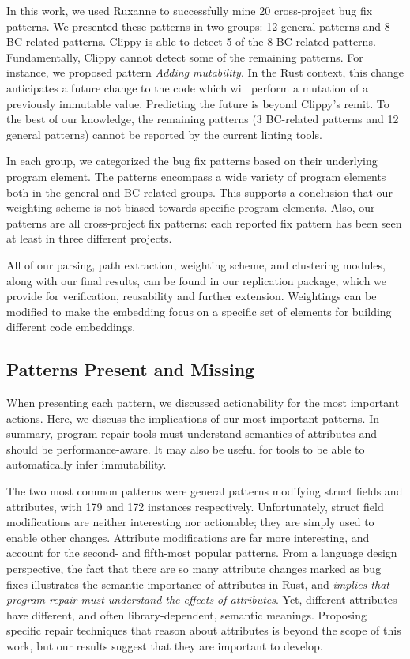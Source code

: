 In this work, we used Ruxanne to successfully mine 20 cross-project bug fix patterns. We presented these patterns in two groups: 12 general patterns and 8 BC-related patterns. Clippy is able to detect 5 of the 8 BC-related patterns. Fundamentally, Clippy cannot detect some of the remaining patterns. For instance, we proposed pattern \textit{Adding mutability}. In the Rust context, this change anticipates a future change to the code which will perform a mutation of a previously immutable value. Predicting the future is beyond Clippy's remit. To the best of our knowledge, the remaining patterns (3 BC-related patterns and 12 general patterns) cannot be reported by the current linting tools. 

In each group, we categorized the bug fix patterns based on their underlying program element. The patterns encompass a wide variety of program elements both in the general and BC-related groups. This supports a conclusion that our weighting scheme is not biased towards specific program elements. Also, our patterns are all cross-project fix patterns: each reported fix pattern has been seen at least in three different projects.

All of our parsing, path extraction, weighting scheme, and clustering modules, along with our final results, can be found in our replication package, which we provide for verification, reusability and further extension. Weightings can be modified to make the embedding focus on a specific set of elements for building different code embeddings.

\subsection{Patterns Present and Missing}
\label{subsec:patterns}

When presenting each pattern, we discussed actionability for the most important actions. Here, we discuss the implications of our most important patterns. In summary, program repair tools must understand semantics of attributes and should be performance-aware. It may also be useful for tools to be able to automatically infer immutability.

The two most common patterns were general patterns modifying struct fields and attributes, with 179 and 172 instances respectively. Unfortunately, struct field modifications are neither interesting nor actionable; they are simply used to enable other changes. Attribute modifications are far more interesting, and account for the second- and fifth-most popular patterns. From a language design perspective, the fact that there are so many attribute changes marked as bug fixes illustrates the semantic importance of attributes in Rust, and \emph{implies that program repair must understand the effects of attributes}. Yet, different attributes have different, and often library-dependent, semantic meanings. Proposing specific repair techniques that reason about attributes is beyond the scope of this work, but our results suggest that they are important to develop.

